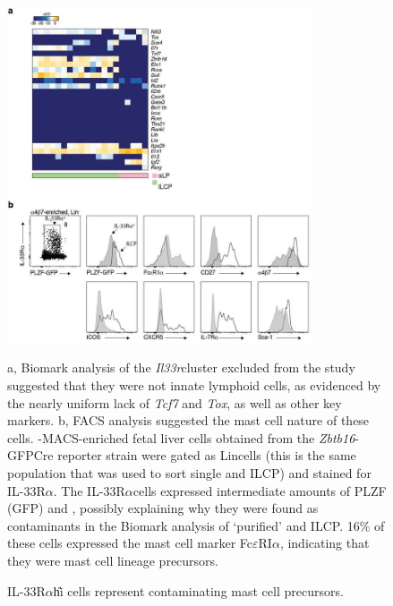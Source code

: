 \begin{figure}[p]
\begin{center}
	\includegraphics[width=0.8\textwidth]{figures/chapter3/S2}
\end{center}
	\caption{\ab\UP IL-33R$\alpha$\U{hi} cells represent contaminating mast cell precursors.} 
	a, Biomark analysis of the \textit{Il33r}\UP cluster excluded from the study suggested that they were not innate lymphoid cells, as evidenced by the nearly uniform lack of \textit{Tcf7} and \textit{Tox}, as well as other key markers. b, FACS analysis suggested the mast cell nature of these cells. \ab-MACS-enriched fetal liver cells obtained from the \textit{Zbtb16}-GFPCre reporter strain were gated as Lin\UM cells (this is the same population that was used to sort single \aLP and ILCP) and stained for IL-33R$\alpha$. The IL-33R$\alpha$\UP cells expressed intermediate amounts of PLZF (GFP) and \ab, possibly explaining why they were found as contaminants in the Biomark analysis of ‘purified’ \aLP and ILCP. 16\% of these cells expressed the mast cell marker Fc$\varepsilon$RI$\alpha$, indicating that they were mast cell lineage precursors.
	\label{fig:chap3_S2}
\end{figure}

